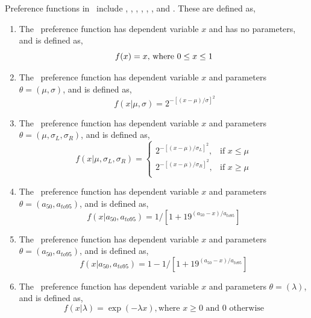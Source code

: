 Preference functions in \SPM\ include , , , , , , and . These are defined as,

\begin{enumerate}
\item The \ preference function has dependent variable $x$ and has no parameters, and is defined as,
\begin{equation}
f(x)=x$, where $0 \leq x \leq 1
\end{equation}

\item The \ preference function has dependent variable $x$ and parameters $\theta = (\mu,\sigma)$, and is defined as, 
\begin{equation}\
f(x | \mu, \sigma) = 2^{-[(x- \mu)/\sigma ]^2} 
\end{equation}
 
\item The \ preference function has dependent variable $x$ and parameters $\theta=(\mu,\sigma_L,\sigma_R)$, and is defined as,
\begin{equation}
  f(x | \mu, \sigma_L, \sigma_R) = \begin{cases}
    2^{-[(x- \mu)/\sigma_L ]^2}, & \text{if $x \leq \mu$} \\
    2^{-[(x- \mu)/\sigma_R ]^2}, & \text{if $x \ge \mu$}\\
  \end{cases}
\end{equation} 

\item The \ preference function has dependent variable $x$ and parameters $\theta = (a_{50},a_{to95})$, and is defined as,
\begin{equation}
  f(x | a_{50}, a_{to95}) = 1 / [1+19^{(a_{50}-x)/a_{to95}}]
\end{equation}

\item The \ preference function has dependent variable $x$ and parameters $\theta = (a_{50},a_{to95})$, and is defined as,
\begin{equation}
  f(x | a_{50}, a_{to95}) =1- 1 / [1+19^{(a_{50}-x)/a_{to95}}]
\end{equation}

\item The \ preference function has dependent variable $x$ and parameters $\theta = (\lambda)$, and is defined as,
\begin{equation}
  f(x | \lambda) =\exp(-\lambda x), \text{where $x \geq 0$ and $0$ otherwise}
\end{equation}


\end{enumerate}
